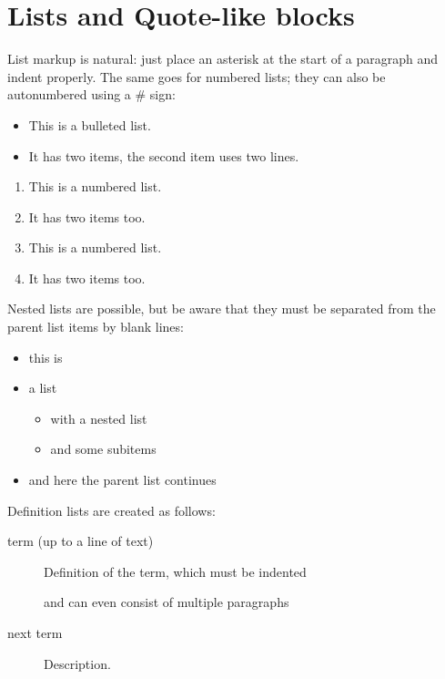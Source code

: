 \documentclass[letterpaper,10pt,english]{sphinxmanual}
\begin{document}
\section{Lists and Quote-like blocks}
\label{\detokenize{usage/introduction:lists-and-quote-like-blocks}}
List markup is natural:
just place an asterisk at the start of a paragraph and indent properly.
The same goes for numbered lists; they can also be autonumbered using a \# sign:
\begin{itemize}
\item {} 
This is a bulleted list.

\item {} 
It has two items, the second
item uses two lines.

\end{itemize}
\begin{enumerate}
\item {} 
This is a numbered list.

\item {} 
It has two items too.

\item {} 
This is a numbered list.

\item {} 
It has two items too.

\end{enumerate}

Nested lists are possible,
but be aware that they must be separated from the parent list items by blank lines:
\begin{itemize}
\item {} 
this is

\item {} 
a list
\begin{itemize}
\item {} 
with a nested list

\item {} 
and some subitems

\end{itemize}

\item {} 
and here the parent list continues

\end{itemize}

Definition lists are created as follows:
\begin{description}
\item[{term (up to a line of text)}] \leavevmode
Definition of the term, which must be indented

and can even consist of multiple paragraphs

\item[{next term}] \leavevmode
Description.

\end{description}
\end{document}
